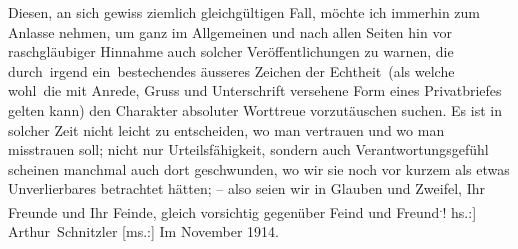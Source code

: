 \pstart
           Diesen, an sich gewiss ziemlich gleichgültigen Fall, möchte ich immerhin zum Anlasse
               nehmen, um ganz im Allgemeinen und {\pb}nach allen Seiten hin
               vor raschgläubiger Hinnahme auch solcher Veröffentlichungen zu warnen, die
               durch irgend ein bestechendes äusseres Zeichen der Echtheit (als welche wohl die mit
               Anrede, Gruss und Unterschrift versehene Form eines Privatbriefes gelten kann) den
               Charakter absoluter Worttreue vorzutäuschen suchen. Es ist in solcher Zeit nicht
               leicht zu entscheiden, wo man vertrauen und wo man misstrauen soll; nicht nur
               Urteilsfähigkeit, sondern auch Verantwortungsgefühl scheinen manchmal auch dort
               geschwunden, wo wir sie noch vor kurzem als etwas Unverlierbares betrachtet hätten; –
               also seien wir in Glauben und Zweifel, Ihr Freunde und Ihr Feinde, gleich vorsichtig
               gegenüber Feind und Freund\substVorne{}\textsuperscript{.}\substDazwischen{}!\substHinten{}\pend
           \pstart {[}hs.:{]} \spacefill\mbox{Arthur Schnitzler}\pend{}
\pstart
           {[}ms.:{]} Im November 1914.\pend
           \endnumbering{}  \newcommand{\dateiname}{L03774}\newcommand{\titel}{Arthur Schnitzler an Stefan Zweig, 27. 11. 1914}\newcommand{\editorInnen}{Selma Jahnke und Martin Anton Müller}
